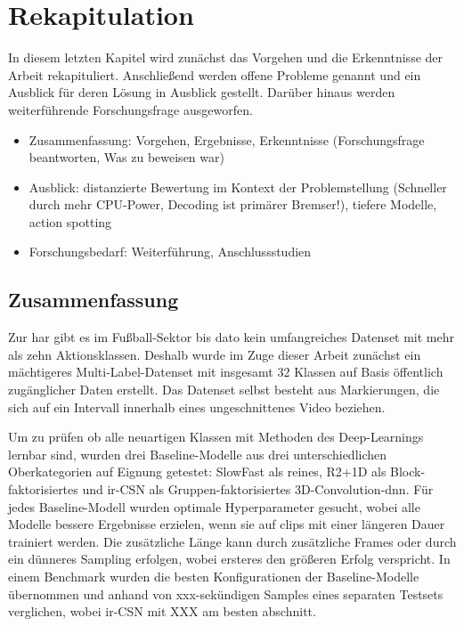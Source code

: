 \chapter{Rekapitulation}
\label{ch:zusammenfassung}

In diesem letzten Kapitel wird zunächst das Vorgehen und die Erkenntnisse der Arbeit rekapituliert.
Anschließend werden offene Probleme genannt und ein Ausblick für deren Lösung in Ausblick gestellt.
Darüber hinaus werden weiterführende Forschungsfrage ausgeworfen.

\begin{tcolorbox}[title=WIP]
 \begin{itemize}
  \item Zusammenfassung: Vorgehen, Ergebnisse, Erkenntnisse (Forschungsfrage beantworten, Was zu beweisen war)
  \item Ausblick: distanzierte Bewertung im Kontext der Problemstellung (Schneller durch mehr CPU-Power, Decoding ist primärer Bremser!), tiefere Modelle, action spotting
  \item Forschungsbedarf: Weiterführung, Anschlussstudien
 \end{itemize}
 \end{tcolorbox}

\section{Zusammenfassung}
\label{sec:rekapitulation}

Zur \gls{har} gibt es im Fußball-Sektor bis dato kein umfangreiches Datenset mit mehr als zehn Aktionsklassen.
Deshalb wurde im Zuge dieser Arbeit zunächst ein mächtigeres Multi-Label-Datenset mit insgesamt 32 Klassen auf Basis öffentlich zugänglicher Daten erstellt.
Das Datenset selbst besteht aus Markierungen, die sich auf ein Intervall innerhalb eines ungeschnittenes Video beziehen.

Um zu prüfen ob alle neuartigen Klassen mit Methoden des Deep-Learnings lernbar sind, wurden drei Baseline-Modelle aus drei unterschiedlichen Oberkategorien auf Eignung getestet:
SlowFast als reines, R2+1D als Block-faktorisiertes und ir-CSN als Gruppen-faktorisiertes 3D-Convolution-\gls{dnn}.
Für jedes Baseline-Modell wurden optimale Hyperparameter gesucht, wobei alle Modelle bessere Ergebnisse erzielen, wenn sie auf \glspl{clip} mit einer längeren Dauer trainiert werden.
Die zusätzliche Länge kann durch zusätzliche Frames oder durch ein dünneres Sampling erfolgen, wobei ersteres den größeren Erfolg verspricht.
In einem Benchmark wurden die besten Konfigurationen der Baseline-Modelle übernommen und anhand von xxx-sekündigen Samples eines separaten Testsets verglichen, wobei ir-CSN mit XXX am besten abschnitt.

